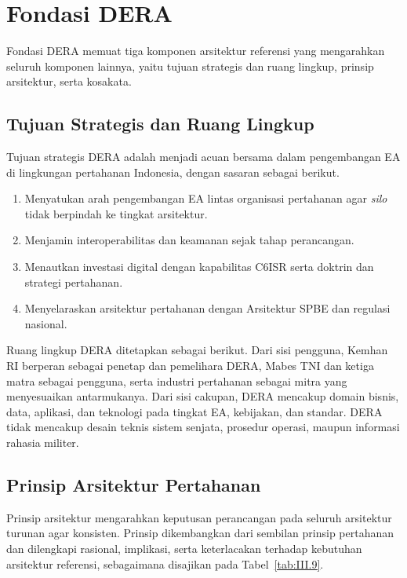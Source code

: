 \section{Fondasi DERA}
\label{sec:III.3}

Fondasi DERA memuat tiga komponen arsitektur referensi yang mengarahkan seluruh komponen lainnya, yaitu tujuan strategis dan ruang lingkup, prinsip arsitektur, serta kosakata.

\subsection{Tujuan Strategis dan Ruang Lingkup}
\label{sec:III.3.1}

Tujuan strategis DERA adalah menjadi acuan bersama dalam pengembangan EA di lingkungan pertahanan Indonesia, dengan sasaran sebagai berikut.

\begin{enumerate}[label=\arabic*.]
\item Menyatukan arah pengembangan EA lintas organisasi pertahanan agar \textit{silo} tidak berpindah ke tingkat arsitektur.
\item Menjamin interoperabilitas dan keamanan sejak tahap perancangan.
\item Menautkan investasi digital dengan kapabilitas C6ISR serta doktrin dan strategi pertahanan.
\item Menyelaraskan arsitektur pertahanan dengan Arsitektur SPBE dan regulasi nasional.
\end{enumerate}

Ruang lingkup DERA ditetapkan sebagai berikut. Dari sisi pengguna, Kemhan RI berperan sebagai penetap dan pemelihara DERA, Mabes TNI dan ketiga matra sebagai pengguna, serta industri pertahanan sebagai mitra yang menyesuaikan antarmukanya. Dari sisi cakupan, DERA mencakup domain bisnis, data, aplikasi, dan teknologi pada tingkat EA, kebijakan, dan standar. DERA tidak mencakup desain teknis sistem senjata, prosedur operasi, maupun informasi rahasia militer.

\subsection{Prinsip Arsitektur Pertahanan}
\label{sec:III.3.2}

Prinsip arsitektur mengarahkan keputusan perancangan pada seluruh arsitektur turunan agar konsisten. Prinsip dikembangkan dari sembilan prinsip pertahanan dan dilengkapi rasional, implikasi, serta keterlacakan terhadap kebutuhan arsitektur referensi, sebagaimana disajikan pada Tabel~\ref{tab:III.9}.

